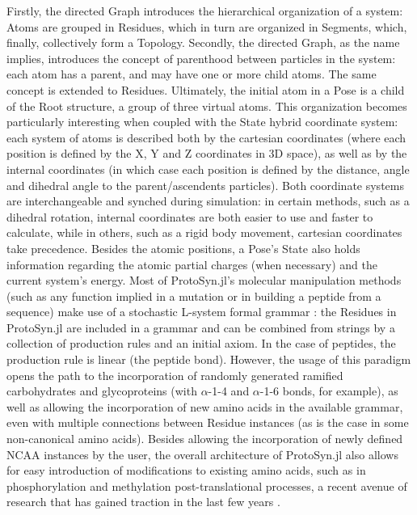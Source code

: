 \documentclass{juliacon}
\begin{document}
Firstly, the directed Graph introduces the hierarchical organization of a system: Atoms are grouped in Residues, which in turn are organized in Segments, which, finally, collectively form a Topology. Secondly, the directed Graph, as the name implies, introduces the concept of parenthood between particles in the system: each atom has a parent, and may have one or more child atoms. The same concept is extended to Residues. Ultimately, the initial atom in a Pose is a child of the Root structure, a group of three virtual atoms.\vspace{5mm}
This organization becomes particularly interesting when coupled with the State hybrid coordinate system: each system of atoms is described both by the cartesian coordinates (where each position is defined by the X, Y and Z coordinates in 3D space), as well as by the internal coordinates (in which case each position is defined by the distance, angle and dihedral angle to the parent/ascendents particles). Both coordinate systems are interchangeable and synched during simulation: in certain methods, such as a dihedral rotation, internal coordinates are both easier to use and faster to calculate, while in others, such as a rigid body movement, cartesian coordinates take precedence.\vspace{5mm}
Besides the atomic positions, a Pose’s State also holds information regarding the atomic partial charges (when necessary) and the current system’s energy.\vspace{5mm}
Most of ProtoSyn.jl’s molecular manipulation methods (such as any function implied in a mutation or in building a peptide from a sequence) make use of a stochastic L-system formal grammar \cite{Prusinkiewicz1990}: the Residues in ProtoSyn.jl are included in a grammar and can be combined from strings by a collection of production rules and an initial axiom. In the case of peptides, the production rule is linear (the peptide bond). However, the usage of this paradigm opens the path to the incorporation of randomly generated ramified carbohydrates and glycoproteins (with $\alpha$-1-4 and $\alpha$-1-6 bonds, for example), as well as allowing the incorporation of new amino acids in the available grammar, even with multiple connections between Residue instances (as is the case in some non-canonical amino acids). Besides allowing the incorporation of newly defined NCAA instances by the user, the overall architecture of ProtoSyn.jl also allows for easy introduction of modifications to existing amino acids, such as in phosphorylation and methylation post-translational processes, a recent avenue of research that has gained traction in the last few years \cite{Gang2021, Nagata2014}.\vspace{5mm}
\end{document}
